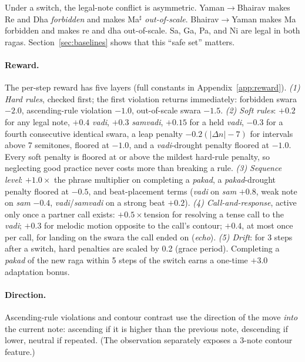 \documentclass[11pt]{article}
\newcommand{\sw}[1]{\textit{#1}}  %
\begin{document}
Under a switch, the legal-note conflict is asymmetric. Yaman$\to$Bhairav makes Re and Dha \emph{forbidden} and makes Ma$^\sharp$ \emph{out-of-scale}. Bhairav$\to$Yaman makes Ma forbidden and makes re and dha out-of-scale. Sa, Ga, Pa, and Ni are legal in both ragas. Section~\ref{sec:baselines} shows that this ``safe set'' matters.

\paragraph{Reward.} The per-step reward has five layers (full constants in Appendix~\ref{app:reward}).
\textit{(1) Hard rules}, checked first; the first violation returns immediately: forbidden swara $-2.0$, ascending-rule violation $-1.0$, out-of-scale swara $-1.5$.
\textit{(2) Soft rules}: $+0.2$ for any legal note, $+0.4$ \sw{vadi}, $+0.3$ \sw{samvadi}, $+0.15$ for a held \sw{vadi}, $-0.3$ for a fourth consecutive identical swara, a leap penalty $-0.2(|\Delta n|-7)$ for intervals above 7 semitones, floored at $-1.0$, and a \sw{vadi}-drought penalty floored at $-1.0$. Every soft penalty is floored at or above the mildest hard-rule penalty, so neglecting good practice never costs more than breaking a rule.
\textit{(3) Sequence level}: $+1.0\times$ the phrase multiplier on completing a \sw{pakad}, a \sw{pakad}-drought penalty floored at $-0.5$, and beat-placement terms (\sw{vadi} on \sw{sam} $+0.8$, weak note on \sw{sam} $-0.4$, \sw{vadi}/\sw{samvadi} on a strong beat $+0.2$).
\textit{(4) Call-and-response}, active only once a partner call exists: $+0.5\times$tension for resolving a tense call to the \sw{vadi}; $+0.3$ for melodic motion opposite to the call's contour; $+0.4$, at most once per call, for landing on the swara the call ended on (\emph{echo}).
\textit{(5) Drift}: for 3 steps after a switch, hard penalties are scaled by 0.2 (grace period). Completing a \sw{pakad} of the new raga within 5 steps of the switch earns a one-time $+3.0$ adaptation bonus.

\paragraph{Direction.} Ascending-rule violations and contour contrast use the direction of the move \emph{into} the current note: ascending if it is higher than the previous note, descending if lower, neutral if repeated. (The observation separately exposes a 3-note contour feature.)
\end{document}

